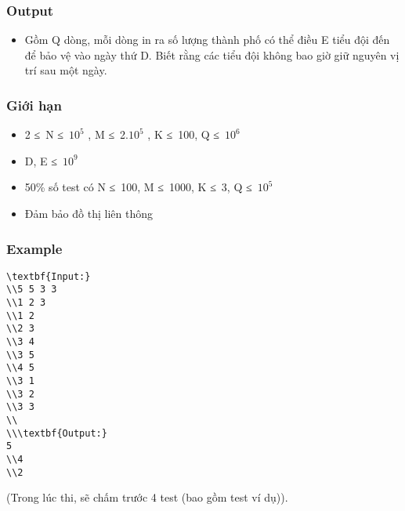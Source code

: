\subsubsection{   Output  }
\begin{itemize}
	\item     Gồm Q dòng, mỗi dòng in ra số lượng thành phố có thể điều E tiểu đội đến để bảo vệ vào ngày thứ D. Biết rằng các tiểu đội không bao giờ giữ nguyên vị trí sau một ngày.   
\end{itemize}

\subsubsection{   Giới hạn  }
\begin{itemize}
	\item     2 ≤ N ≤ $10^{5}$    , M ≤ 2.$10^{5}$    , K ≤ 100, Q ≤ $10^{6}$
	\item     D, E ≤ $10^{9}$
	\item     50\% số test có N ≤ 100, M ≤ 1000, K ≤ 3, Q ≤ $10^{5}$
	\item     Đảm bảo đồ thị liên thông   
\end{itemize}

\subsubsection{   Example  }
\begin{verbatim}
\textbf{Input:}
\\5 5 3 3
\\1 2 3
\\1 2
\\2 3
\\3 4
\\3 5
\\4 5
\\3 1
\\3 2
\\3 3
\\
\\\textbf{Output:}
5
\\4
\\2\end{verbatim}

(Trong lúc thi, sẽ chấm trước 4 test (bao gồm test ví dụ)).
